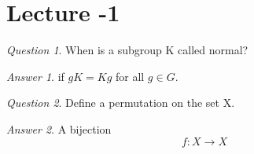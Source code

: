 \documentclass[]{article}
\theoremstyle{remark}
\theoremstyle{qnstyle}
\newtheorem{question}{Question}
\theoremstyle{answerstyle}
\newtheorem*{answer}{Answer}
\begin{document}
\title{}
\author{}
\section*{ Lecture -1}
{
    \begin{question}
        When is a subgroup K called normal?
    \end{question}
    \begin{answer}
        if $gK = Kg$ for all $g \in G$.
    \end{answer}
}
{
    \begin{question}
        Define a permutation on the set X.
    \end{question}
    \begin{answer}
        A bijection $$f: X \to X$$
    \end{answer}
}
\end{document}

